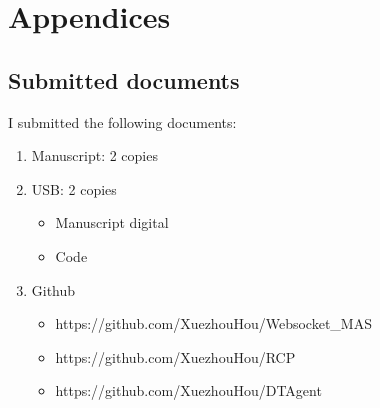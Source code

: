 \chapter{Appendices}\label{chap: append}
\section{Submitted documents}
I submitted the following documents:
\begin{enumerate}
\item Manuscript: 2 copies
\item USB: 2 copies
    \begin{itemize}
        \item Manuscript digital 
        \item Code
    \end{itemize}

\item Github
\begin{itemize}
    \item https://github.com/XuezhouHou/Websocket\_MAS
    \item https://github.com/XuezhouHou/RCP
    \item https://github.com/XuezhouHou/DTAgent
\end{itemize}
\end{enumerate}





\newpage
